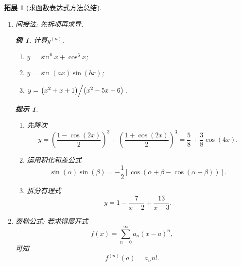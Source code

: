 \documentclass[a4paper, 12pt]{ctexart}
\theoremstyle{plain}
\theoremstyle{nonumberplain}
\newtheorem{hint}{提示}
\theoremstyle{nonumberplain}
\newtheorem{supplement}{拓展}
\theoremstyle{nonumberplain}
\newtheorem{example}{例}
\begin{document}
\begin{supplement}[求函数表达式方法总结]
\begin{enumerate}[1.]
\begin{equation}
            \end{equation}
            \item 间接法: 先拆项再求导.
            \begin{example}
                计算$y^{(n)}$.
                \begin{enumerate}[\hspace{2em}(1)]
                    \item $y=\sin^6x+\cos^6x$;
                    \item $y=\sin(ax)\sin(bx)$;
                    \item $y=\left.\left(x^2+x+1\right)\middle/\left(x^2-5x+6\right)\right.$.
                \end{enumerate}
            \end{example}
            \begin{hint}\hspace{\fill}
                \begin{enumerate}[\hspace{2em}(1)]
                    \item 先降次
                    \begin{equation}
                        y=\left(\frac{1-\cos(2x)}{2}\right)^3+\left(\frac{1+\cos(2x)}{2}\right)^3=\frac{5}{8}+\frac{3}{8}\cos(4x).
                    \end{equation}
                    \item 运用积化和差公式
                    \begin{equation}
                        \sin(\alpha)\sin(\beta)=-\frac{1}{2}\left[\cos(\alpha+\beta-\cos(\alpha-\beta))\right].
                    \end{equation}
                    \item 拆分有理式
                    \begin{equation}
                        y=1-\frac{7}{x-2}+\frac{13}{x-3}.
                    \end{equation}
                \end{enumerate}
            \end{hint}
            \item 泰勒公式: 若求得展开式
            \begin{equation}
                f(x)=\sum_{n=0}^{\infty}a_n(x-a)^n,
            \end{equation}
            可知
            \begin{equation}
                f^{(n)}(a)=a_nn!.
            \end{equation}
        \end{enumerate}
    \end{supplement}
\end{document}

